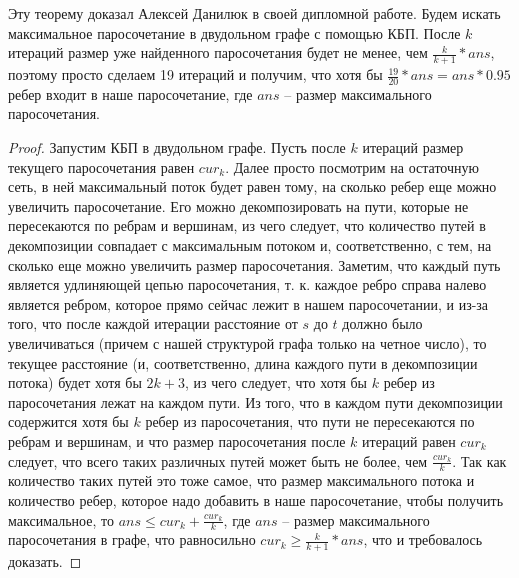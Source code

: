 \begin{theorem}[Умника]
    Эту теорему доказал Алексей Данилюк в своей дипломной работе. Будем искать максимальное паросочетание в двудольном графе с помощью КБП. После $k$ итераций размер уже найденного паросочетания будет не менее, чем $\frac{k}{k+1} * ans$, поэтому просто сделаем 19 итераций и получим, что хотя бы $\frac{19}{20} * ans = ans * 0.95$ ребер входит в наше паросочетание, где $ans$ -- размер максимального паросочетания.
\end{theorem}

\begin{proof}
    Запустим КБП в двудольном графе. Пусть после $k$ итераций размер текущего паросочетания равен $cur_k$. Далее просто посмотрим на остаточную сеть, в ней максимальный поток будет равен тому, на сколько ребер еще можно увеличить паросочетание. Его можно декомпозировать на пути, которые не пересекаются по ребрам и вершинам, из чего следует, что количество путей в декомпозиции совпадает с максимальным потоком и, соответственно, с тем, на сколько еще можно увеличить размер паросочетания. Заметим, что каждый путь является удлиняющей цепью паросочетания, т. к. каждое ребро справа налево является ребром, которое прямо сейчас лежит в нашем паросочетании, и из-за того, что после каждой итерации расстояние от $s$ до $t$ должно было увеличиваться (причем с нашей структурой графа только на четное число), то текущее расстояние (и, соответственно, длина каждого пути в декомпозиции потока) будет хотя бы $2k + 3$, из чего следует, что хотя бы $k$ ребер из паросочетания лежат на каждом пути. Из того, что в каждом пути декомпозиции содержится хотя бы $k$ ребер из паросочетания, что пути не пересекаются по ребрам и вершинам, и что размер паросочетания после $k$ итераций равен $cur_k$ следует, что всего таких различных путей может быть не более, чем $\frac{cur_k}{k}$. Так как количество таких путей это тоже самое, что размер максимального потока и количество ребер, которое надо добавить в наше паросочетание, чтобы получить максимальное, то $ans \leq cur_k + \frac{cur_k}{k}$, где $ans$ -- размер максимального паросочетания в графе, что равносильно $cur_k \geq \frac{k}{k+1} * ans$, что и требовалось доказать.
\end{proof}


